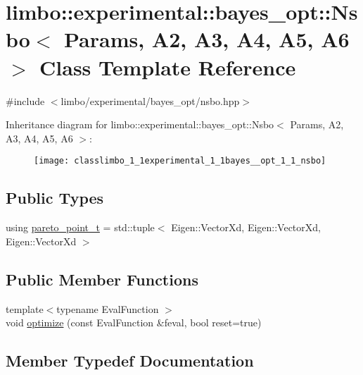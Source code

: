 \hypertarget{classlimbo_1_1experimental_1_1bayes__opt_1_1_nsbo}{}\section{limbo\+:\+:experimental\+:\+:bayes\+\_\+opt\+:\+:Nsbo$<$ Params, A2, A3, A4, A5, A6 $>$ Class Template Reference}
\label{classlimbo_1_1experimental_1_1bayes__opt_1_1_nsbo}


{\ttfamily \#include $<$limbo/experimental/bayes\+\_\+opt/nsbo.\+hpp$>$}

Inheritance diagram for limbo\+:\+:experimental\+:\+:bayes\+\_\+opt\+:\+:Nsbo$<$ Params, A2, A3, A4, A5, A6 $>$\+:\begin{figure}[H]
\begin{center}
\leavevmode
\texttt{[image: classlimbo\_1\_1experimental\_1\_1bayes\_\_opt\_1\_1\_nsbo]}
\end{center}
\end{figure}
\subsection*{Public Types}
\begin{DoxyCompactItemize}
\item 
using \hyperlink{classlimbo_1_1experimental_1_1bayes__opt_1_1_nsbo_a93c82b65f5d97442e1c8299ea1a17f49}{pareto\+\_\+point\+\_\+t} = std\+::tuple$<$ Eigen\+::\+Vector\+Xd, Eigen\+::\+Vector\+Xd, Eigen\+::\+Vector\+Xd $>$
\end{DoxyCompactItemize}
\subsection*{Public Member Functions}
\begin{DoxyCompactItemize}
\item 
{\footnotesize template$<$typename Eval\+Function $>$ }\\void \hyperlink{classlimbo_1_1experimental_1_1bayes__opt_1_1_nsbo_a58cae8a4e4902070ef05e9320604805f}{optimize} (const Eval\+Function \&feval, bool reset=true)
\end{DoxyCompactItemize}


\subsection{Member Typedef Documentation}
\hypertarget{classlimbo_1_1experimental_1_1bayes__opt_1_1_nsbo_a93c82b65f5d97442e1c8299ea1a17f49}{}
